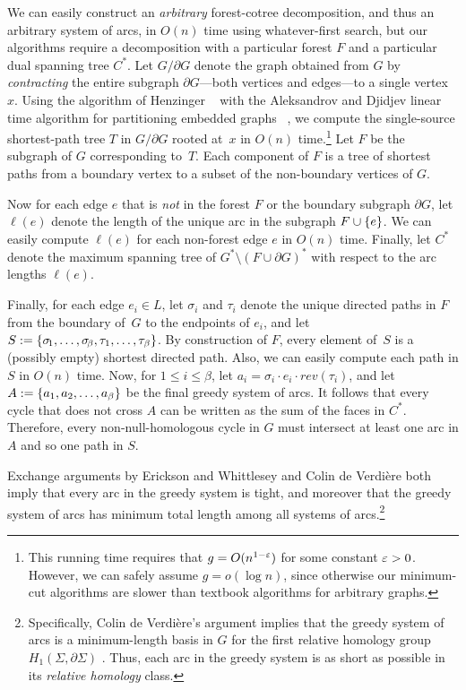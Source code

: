 \documentclass[letterpaper,review]{siamart190516}
\def\rev{\mathit{rev}}
\def\modified#1{\color{blue}#1 \color{black}}
\begin{document}
We can easily construct an \emph{arbitrary} forest-cotree decomposition, and thus an arbitrary system of arcs, in $O(n)$ time using whatever-first search, but our algorithms require a decomposition with a particular forest $F$ and a particular dual spanning tree $C^*$.  Let $G/\partial G$ denote the graph obtained from $G$ by \emph{contracting} the entire subgraph $\partial G$---both vertices and edges---to a single vertex~$x$.  Using the algorithm of Henzinger \etal~\cite{hkrs-fspap-97} \modified{with the Aleksandrov and Djidjev linear time algorithm for partitioning embedded graphs~\cite{ad-lapegbg-96}}, we compute the single-source shortest-path tree $T$ in $G/\partial G$ rooted at~$x$ in $O(n)$ time.\footnote{This running time requires that $g = O(n^{1-\varepsilon})$ for some constant $\varepsilon>0$.  However, we can safely assume $g = o(\log n)$, since otherwise our minimum-cut algorithms are slower than textbook algorithms for arbitrary graphs.}  Let $F$ be the subgraph of $G$ corresponding to~$T$.  Each component of $F$ is a tree of shortest paths from a boundary vertex to a subset of the non-boundary vertices of $G$.

Now for each edge $e$ that is \emph{not} in the forest $F$ or the boundary subgraph $\partial G$, let $\ell(e)$ denote the length of the unique arc in the subgraph $F \cup\{ e \}$.  We can easily compute $\ell(e)$ for each non-forest edge $e$ in $O(n)$ time.  Finally, let $C^*$ denote the maximum spanning tree of $G^* \setminus (F\cup \partial G)^*$ with respect to the arc lengths $\ell(e)$.


Finally, for each edge $e_i\in L$, let $\sigma_i$ and $\tau_i$ denote the unique directed paths in $F$ from the boundary of~$G$ to the endpoints of $e_i$, and let $S := \{ \sigma\!_1, \dots, \sigma\!_\beta, \allowbreak \tau_1, \dots, \tau_\beta \}$.  By construction of $F$, every element of~$S$ is a (possibly empty) shortest directed path.  \modified{Also, we can easily compute each path in $S$ in $O(n)$ time. 
Now, for $1\leq i \leq \beta$, let $a_i = \sigma_i \cdot e_i \cdot \rev(\tau_i)$, and let $A := \{ a_1, a_2, \dots, a_\beta \}$ be the final greedy system of arcs.  
It follows that every cycle that does not cross $A$ can be written as the sum of the faces in $C^*$.
Therefore, every non-null-homologous cycle in $G$ must intersect at least one arc in $A$ and so one path in $S$.}

Exchange arguments by Erickson and Whittlesey \cite{ew-gohhg-05} and Colin de Verdière \cite{c-scgsp-10} both imply that every arc in the greedy system is tight, and moreover that the greedy system of arcs has minimum total length among all systems of arcs.\footnote{Specifically, Colin de Verdière’s argument implies that the greedy system of arcs is a minimum-length basis in $G$ for the first relative homology group $H_1(\Sigma, \partial\Sigma)$ \cite[Section 3]{c-scgsp-10}.  Thus, each arc in the greedy system is as short as possible in its \emph{relative homology} class.}
\end{document}
